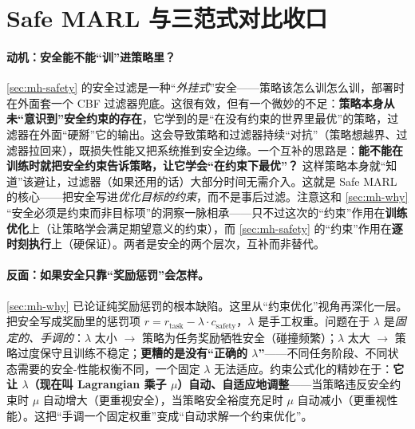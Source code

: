 \section{Safe MARL 与三范式对比收口}
\label{sec:mh-safemarl}

\paragraph{动机：安全能不能“训”进策略里？}
\cref{sec:mh-safety} 的安全过滤是一种“\emph{外挂式}”安全——策略该怎么训怎么训，部署时在外面套一个 CBF 过滤器兜底。这很有效，但有一个微妙的不足：\textbf{策略本身从未“意识到”安全约束的存在}，它学到的是“在没有约束的世界里最优”的策略，过滤器在外面“硬掰”它的输出。这会导致策略和过滤器持续“对抗”（策略想越界、过滤器拉回来），既损失性能又把系统推到安全边缘。一个互补的思路是：\textbf{能不能在训练时就把安全约束告诉策略，让它学会“在约束下最优”？} 这样策略本身就“知道”该避让，过滤器（如果还用的话）大部分时间无需介入。这就是 Safe MARL 的核心——把安全写进\emph{优化目标的约束}，而不是事后过滤。注意这和 \cref{sec:mh-why} “安全必须是约束而非目标项”的洞察一脉相承——只不过这次的“约束”作用在\textbf{训练优化}上（让策略学会满足期望意义的约束），而 \cref{sec:mh-safety} 的“约束”作用在\textbf{逐时刻执行}上（硬保证）。两者是安全的两个层次，互补而非替代。

\paragraph{反面：如果安全只靠“奖励惩罚”会怎样。}
\cref{sec:mh-why} 已论证纯奖励惩罚的根本缺陷。这里从“约束优化”视角再深化一层。把安全写成奖励里的惩罚项 $r=r_{\text{task}}-\lambda\cdot c_{\text{safety}}$，$\lambda$ 是手工权重。问题在于 $\lambda$ 是\emph{固定的、手调的}：$\lambda$ 太小 $\to$ 策略为任务奖励牺牲安全（碰撞频繁）；$\lambda$ 太大 $\to$ 策略过度保守且训练不稳定；\textbf{更糟的是没有“正确的 $\lambda$”}——不同任务阶段、不同状态需要的安全-性能权衡不同，一个固定 $\lambda$ 无法适应。约束公式化的精妙在于：\textbf{它让 $\lambda$（现在叫 Lagrangian 乘子 $\mu$）自动、自适应地调整}——当策略违反安全约束时 $\mu$ 自动增大（更重视安全），当策略安全裕度充足时 $\mu$ 自动减小（更重视性能）。这把“手调一个固定权重”变成“自动求解一个约束优化”。

